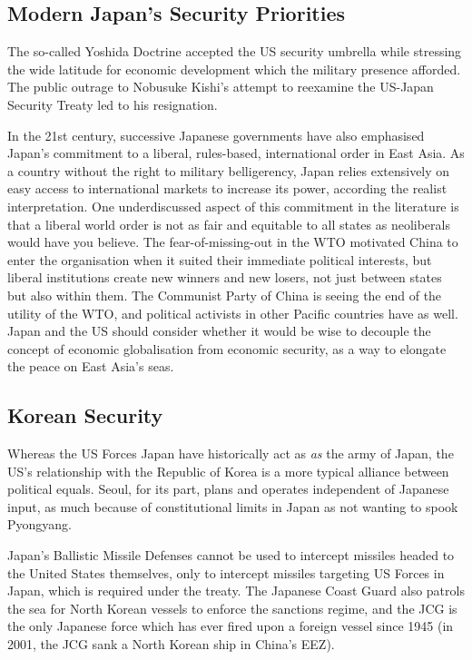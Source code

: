 \documentclass[letterpaper,12pt,twoside]{article} %
\begin{document}
\begin{multicols}{2}
\section{Modern Japan's Security Priorities}

The so-called Yoshida Doctrine accepted the US security umbrella while stressing the wide latitude for economic development which the military presence afforded. The public outrage to Nobusuke Kishi's attempt to reexamine the US-Japan Security Treaty led to his resignation.

In the 21st century, successive Japanese governments have also emphasised Japan's commitment to a liberal, rules-based, international order in East Asia. As a country without the right to military belligerency, Japan relies extensively on easy access to international markets to increase its power, according the realist interpretation. One underdiscussed aspect of this commitment in the literature is that a liberal world order is not as fair and equitable to all states as neoliberals would have you believe. The fear-of-missing-out in the WTO motivated China to enter the organisation when it suited their immediate political interests, but liberal institutions create new winners and new losers, not just between states but also within them. The Communist Party of China is seeing the end of the utility of the WTO, and political activists in other Pacific countries have as well. Japan and the US should consider whether it would be wise to decouple the concept of economic globalisation from economic security, as a way to elongate the peace on East Asia's seas.

\subsection{Korean Security}

Whereas the US Forces Japan have historically act as \textit{as} the army of Japan, the US's relationship with the Republic of Korea is a more typical alliance between political equals. Seoul, for its part, plans and operates independent of Japanese input, as much because of constitutional limits in Japan as not wanting to spook Pyongyang.

Japan's Ballistic Missile Defenses cannot be used to intercept missiles headed to the United States themselves, only to intercept missiles targeting US Forces in Japan, which is required under the treaty. The Japanese Coast Guard also patrols the sea for North Korean vessels to enforce the sanctions regime, and the JCG is the only Japanese force which has ever fired upon a foreign vessel since 1945\autocite[Chapter 3]{smith2019rearmed} (in 2001, the JCG sank a North Korean ship in China's EEZ).


\end{multicols}
\end{document}
